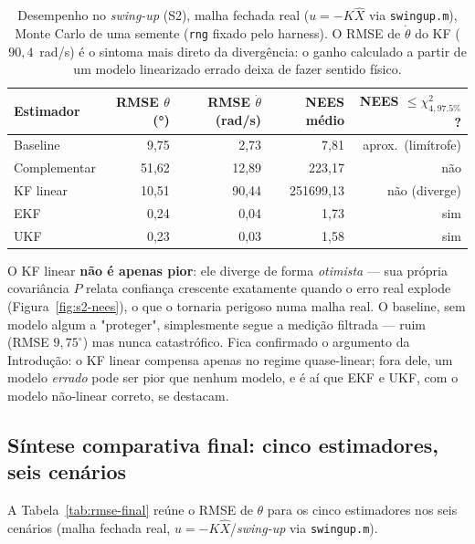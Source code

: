 \documentclass[brazil, 12pt]{article}
\begin{document}
\begin{table}[H]
\centering
\small
\begin{tabular}{@{}l r r r r@{}}
\hline
\textbf{Estimador} & \textbf{RMSE $\theta$ (°)} & \textbf{RMSE $\dot\theta$ (rad/s)} & \textbf{NEES médio} & \textbf{NEES $\leq\chi^2_{4,97.5\%}$?} \\
\hline
Baseline      &  9,75 &  2,73 &        7,81 & aprox.\ (limítrofe) \\
Complementar  & 51,62 & 12,89 &      223,17 & não \\
KF linear     & 10,51 & 90,44 & 251699,13   & não (diverge) \\
EKF           &  0,24 &  0,04 &        1,73 & sim \\
UKF           &  0,23 &  0,03 &        1,58 & sim \\
\hline
\end{tabular}
\caption{Desempenho no \emph{swing-up} (S2), malha fechada real
($u=-K\hat X$ via \texttt{swingup.m}), Monte Carlo de uma semente (\texttt{rng}
fixado pelo harness). O RMSE de $\dot\theta$ do KF ($90{,}4$~rad/s) é o
sintoma mais direto da divergência: o ganho calculado a partir de um modelo
linearizado errado deixa de fazer sentido físico.}
\label{tab:s2-swingup}
\end{table}

O KF linear \textbf{não é apenas pior}: ele diverge de forma \emph{otimista}
— sua própria covariância $P$ relata confiança crescente exatamente quando o
erro real explode (Figura~\ref{fig:s2-nees}), o que o tornaria perigoso numa
malha real. O baseline, sem modelo algum a "proteger", simplesmente segue a
medição filtrada — ruim (RMSE $9{,}75^{\circ}$) mas nunca catastrófico. Fica
confirmado o argumento da Introdução: o KF linear compensa apenas no regime
quase-linear; fora dele, um modelo \emph{errado} pode ser pior que nenhum
modelo, e é aí que EKF e UKF, com o modelo não-linear correto, se destacam.

\subsection{Síntese comparativa final: cinco estimadores, seis cenários}
\label{sec:sintese-final}

A Tabela~\ref{tab:rmse-final} reúne o RMSE de $\theta$ para os cinco
estimadores nos seis cenários (malha fechada real, $u=-K\hat X$/\emph{swing-up}
via \texttt{swingup.m}).
\end{document}
